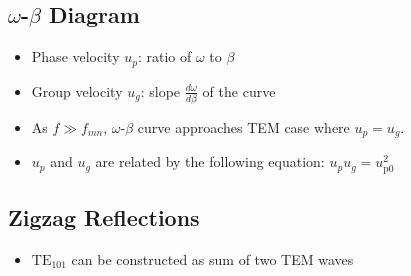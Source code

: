 \documentclass[a4paper]{article}
\begin{document}
\subsection{\texorpdfstring{$\omega$-$\beta$}{Omega-Beta}  Diagram}
\begin{itemize}
    \item Phase velocity $u_p$: ratio of $\omega$ to $\beta$
    \item Group velocity $u_g$: slope $\displaystyle\frac{d\omega}{d\beta}$ of the curve 
    \item As $f\gg f_{mn}$, $\omega$-$\beta$ curve approaches TEM case where $u_p=u_g$.
    \item $u_p$ and $u_g$ are related by the following equation: \quad $u_pu_g = u_\text{p0}^2$
\end{itemize}

\subsection{Zigzag Reflections}
\begin{itemize}
    \item $\text{TE}_{101}$ can be constructed as sum of two TEM waves
\end{itemize}
\end{document}
